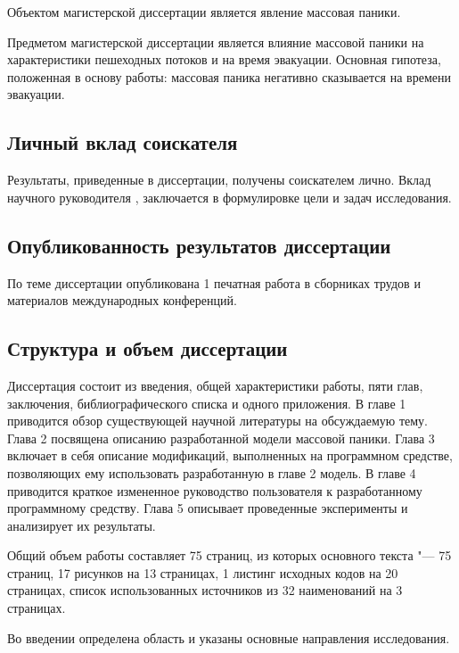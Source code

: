 Объектом магистерской диссертации является явление массовая паники.

Предметом магистерской диссертации является влияние массовой паники на характеристики пешеходных потоков и на время эвакуации.
Основная гипотеза, положенная в основу работы: массовая паника негативно сказывается на времени эвакуации.

\subsection*{\textbf{Личный вклад соискателя}}

Результаты, приведенные в диссертации, получены соискателем лично.
Вклад научного руководителя \mastersCharSupervisor, заключается в формулировке цели и задач исследования.

\subsection*{\textbf{Опубликованность результатов диссертации}}

По теме диссертации опубликована 1 печатная работа в сборниках трудов и материалов международных конференций.

\subsection*{\textbf{Структура и объем диссертации}}

Диссертация состоит из введения, общей характеристики работы, пяти глав, заключения, библиографического списка и одного приложения.
В главе 1 приводится обзор существующей научной литературы на обсуждаемую тему. Глава 2 посвящена описанию разработанной модели массовой паники.
Глава 3 включает в себя описание модификаций, выполненных на программном средстве, позволяющих ему использовать разработанную в главе 2 модель.
В главе 4 приводится краткое измененное руководство пользователя к разработанному программному средству.
Глава 5 описывает проведенные эксперименты и анализирует их результаты.

Общий объем работы составляет 75 страниц, из которых основного текста "--- 75 страниц, 17 рисунков на 13 страницах, 1 листинг исходных кодов на 20 страницах,
список использованных источников из 32 наименований на 3 страницах.



Во введении определена область и указаны основные направления исследования.

